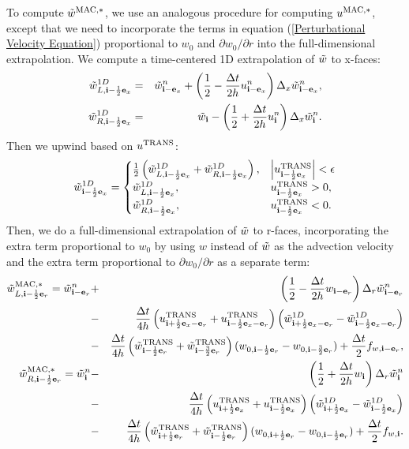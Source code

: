 To compute $\tilde{w}^{\rm MAC,*}$, we use an analogous procedure for computing
$u^{\rm MAC,*}$, except that we need to incorporate the terms in equation
(\ref{Perturbational Velocity Equation}) proportional to $w_0$ and
$\partial w_0/\partial r$ into the full-dimensional extrapolation.  We
compute a time-centered 1D extrapolation of $\tilde{w}$ to x-faces:
\begin{eqnarray}
\tilde{w}_{L,{\bf i}-\frac{1}{2}{\bf e}_x}^{1D} &=& \tilde{w}_{{\bf i}-{\bf e}_x}^n + \left(\frac{1}{2} - \frac{\Delta t}{2h}u_{{\bf i}-{\bf e}_x}^n\right)\Delta_x \tilde{w}_{{\bf i}-{\bf e}_x}^n, \\
\tilde{w}_{R,{\bf i}-\frac{1}{2}{\bf e}_x}^{1D} &=& \tilde{w}_{{\bf i}} - \left(\frac{1}{2} + \frac{\Delta t}{2h}u_{{\bf i}}^n\right)\Delta_x \tilde{w}_{{\bf i}}^n.
\end{eqnarray}
Then we upwind based on $u^{\rm TRANS}$:
\begin{equation}
\tilde{w}_{{\bf i}-\frac{1}{2}{\bf e}_x}^{1D} =
\begin{cases}
\frac{1}{2}\left(\tilde{w}_{L,{\bf i}-\frac{1}{2}{\bf e}_x}^{1D} + \tilde{w}_{R,{\bf i}-\frac{1}{2}{\bf e}_x}^{1D}\right), & \left|u^{\rm TRANS}_{{\bf i}-\frac{1}{2}{\bf e}_x}\right| < \epsilon \\
\tilde{w}_{L,{\bf i}-\frac{1}{2}{\bf e}_x}^{1D}, & u^{\rm TRANS}_{{\bf i}-\frac{1}{2}{\bf e}_x} > 0, \\
\tilde{w}_{R,{\bf i}-\frac{1}{2}{\bf e}_x}^{1D}, & u^{\rm TRANS}_{{\bf i}-\frac{1}{2}{\bf e}_x} < 0. \\
\end{cases}
\end{equation}
Then, we do a full-dimensional extrapolation of $\tilde{w}$ to r-faces,
incorporating the extra term proportional to $w_0$ by using $w$
instead of $\tilde{w}$ as the advection velocity and the extra term
proportional to $\partial w_0/\partial r$ as a separate term:
\begin{eqnarray}
\tilde{w}_{L,{\bf i}-\frac{1}{2}{\bf e}_r}^{\rm MAC,*} = \tilde{w}_{{\bf i}-{\bf e}_r}^n &+& \left(\frac{1}{2} - \frac{\Delta t}{2h}w_{{\bf i}-{\bf e}_r}\right)\Delta_r \tilde{w}_{{\bf i}-{\bf e}_r}^n \nonumber \\
&-& \frac{\Delta t}{4h}\left(u_{{\bf i}+\frac{1}{2}{\bf e}_x-{\bf e}_r}^{\rm TRANS}+u_{{\bf i}-\frac{1}{2}{\bf e}_x-{\bf e}_r}^{\rm TRANS}\right)\left(\tilde{w}_{{\bf i}+\frac{1}{2}{\bf e}_x-{\bf e}_r}^{1D} - \tilde{w}_{{\bf i}-\frac{1}{2}{\bf e}_x-{\bf e}_r}^{1D}\right) \nonumber \\
&-& \frac{\Delta t}{4h}\left(\tilde{w}_{{\bf i}-\frac{1}{2}{\bf e}_r}^{\rm TRANS}+\tilde{w}_{{\bf i}-\frac{3}{2}{\bf e}_r}^{\rm TRANS}\right)(w_{0,{\bf i}-\frac{1}{2}{\bf e}_r} - w_{0,{\bf i}-\frac{3}{2}{\bf e}_r}) + \frac{\Delta t}{2}f_{w,{\bf i}-{\bf e}_r},\label{wt_L Extrapolation} \\
\tilde{w}_{R,{\bf i}-\frac{1}{2}{\bf e}_r}^{\rm MAC,*} = \tilde{w}_{{\bf i}}^n &-& \left(\frac{1}{2} + \frac{\Delta t}{2h}w_{{\bf i}}\right)\Delta_r \tilde{w}_{{\bf i}}^n \nonumber \\
&-& \frac{\Delta t}{4h}\left(u_{{\bf i}+\frac{1}{2}{\bf e}_x}^{\rm TRANS}+u_{{\bf i}-\frac{1}{2}{\bf e}_x}^{\rm TRANS}\right)\left(\tilde{w}_{{\bf i}+\frac{1}{2}{\bf e}_x}^{1D} - \tilde{w}_{{\bf i}-\frac{1}{2}{\bf e}_x}^{1D}\right) \nonumber \\
&-& \frac{\Delta t}{4h}\left(\tilde{w}_{{\bf i}+\frac{1}{2}{\bf e}_r}^{\rm TRANS}+\tilde{w}_{{\bf i}-\frac{1}{2}{\bf e}_r}^{\rm TRANS}\right)(w_{0,{\bf i}+\frac{1}{2}{\bf e}_r} - w_{0,{\bf i}-\frac{1}{2}{\bf e}_r}) + \frac{\Delta t}{2}f_{w,{\bf i}}.\label{wt_R Extrapolation}
\end{eqnarray}
